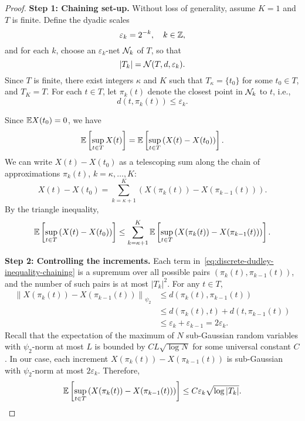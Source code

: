\begin{proof}
	\textbf{Step 1: Chaining set-up.} Without loss of generality, assume \(K=1\) and \(T\) is finite. Define the dyadic scales
	\begin{equation*}
		\varepsilon_{k}=2^{-k},\quad k\in\mathbb{Z},
	\end{equation*}
	and for each \(k\), choose an \(\varepsilon_{k}\)-net \(\mathcal{N}_{k}\) of \(T\), so that
	\begin{equation*}
		|T_{k}|=\mathcal{N}(T,d,\varepsilon_{k}).
	\end{equation*}
	Since \(T\) is finite, there exist integers \(\kappa\) and \(K\) such that \(T_{\kappa}=\{t_{0}\}\) for some \(t_{0}\in T\), and \(T_{K}=T\). For each \(t\in T\), let \(\pi_{k}(t)\) denote the closest point in \(\mathcal{N}_{k}\) to \(t\), i.e.,
	\begin{equation*}
		d(t,\pi_{k}(t))\leq\varepsilon_{k}.
	\end{equation*}

	Since \(\mathbb{E} X(t_{0})=0\), we have
	\begin{equation*}
		\mathbb{E}\left[\sup_{t\in T}X(t)\right]=\mathbb{E}\left[\sup_{t\in T}\left(X(t)-X(t_{0})\right)\right].
	\end{equation*}
	We can write \(X(t)-X(t_{0})\) as a telescoping sum along the chain of approximations \(\pi_{k}(t)\), \(k=\kappa,\ldots,K\):
	\begin{equation*}
		X(t)-X(t_{0})=\sum_{k=\kappa+1}^{K}\left(X(\pi_{k}(t))-X(\pi_{k-1}(t))\right).
	\end{equation*}
	By the triangle inequality,
	\begin{equation}
		\label{eq:discrete-dudley-inequality-chaining}
		\mathbb{E}\left[\sup_{t\in T}\left(X(t)-X(t_{0})\right)\right]\leq\sum_{k=\kappa+1}^{K}\mathbb{E}\left[\sup_{t\in T}\left(X(\pi_{k}(t))-X(\pi_{k-1}(t))\right)\right].
	\end{equation}

	\textbf{Step 2: Controlling the increments.} Each term in~\eqref{eq:discrete-dudley-inequality-chaining} is a supremum over all possible pairs \((\pi_{k}(t),\pi_{k-1}(t))\), and the number of such pairs is at most \(|T_{k}|^{2}\). For any \(t\in T\),
	\begin{align*}
		\left\|X(\pi_{k}(t))-X(\pi_{k-1}(t))\right\|_{\psi_{2}}
		 & \leq d(\pi_{k}(t),\pi_{k-1}(t))                              \\
		 & \leq d(\pi_{k}(t),t) + d(t,\pi_{k-1}(t))                     \\
		 & \leq \varepsilon_{k} + \varepsilon_{k-1} = 2\varepsilon_{k}.
	\end{align*}
	Recall that the expectation of the maximum of \(N\) sub-Gaussian random variables with \(\psi_{2}\)-norm at most \(L\) is bounded by \(CL\sqrt{\log N}\) for some universal constant \(C\). In our case, each increment \(X(\pi_{k}(t)) - X(\pi_{k-1}(t))\) is sub-Gaussian with \(\psi_{2}\)-norm at most \(2\varepsilon_{k}\). Therefore,
	\begin{equation*}
		\mathbb{E}\left[\sup_{t\in T}\left(X(\pi_{k}(t))-X(\pi_{k-1}(t))\right)\right]\leq C\varepsilon_{k}\sqrt{\log |T_{k}|}.
	\end{equation*}


\end{proof}
